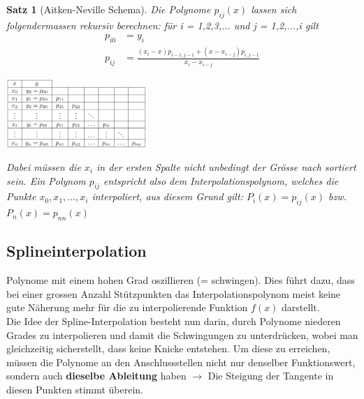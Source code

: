 \documentclass{article}
\newenvironment{Figure}
	{\par\medskip\noindent\minipage{\linewidth}}
	{\endminipage\par\medskip}
\theoremstyle{satz}
\newtheorem*{satz}{Satz}
\theoremstyle{definition}
\begin{document}
\theoremstyle{satz}
\begin{tcolorbox}
\begin{satz}[Aitken-Neville Schema]
Die Polynome $p_{ij}(x)$ lassen sich folgendermassen rekursiv berechnen: für i = 1,2,3,... und j = 1,2,...,i gilt
\begin{equation}
\begin{split}
p_{i0} &= y_i\\
p_{ij} &= \frac{(x_i-x)p_{i-1,j-1}+(x-x_{i-j}) p_{i,j-1}}{x_i-x_{i-j}}
\end{split}
\end{equation}
\begin{Figure}
\centering
\includegraphics[width=200px]{img/AitkenNevilleSchema.png}
	\label{fig:Schematische Darstellung für das Aitken-Neville-Schema}
\end{Figure}
Dabei müssen die $x_i$ in der ersten Spalte nicht unbedingt der Grösse nach sortiert sein. Ein Polynom $p_{ij}$ entspricht also dem Interpolationspolynom, welches die Punkte $x_0, x_1, ..., x_i$ interpoliert, aus diesem Grund gilt: $P_i(x) = p_{ij}(x)$ bzw. $P_n(x) = p_{nn}(x)$
\end{satz}
\end{tcolorbox}

\subsection{Splineinterpolation}
Polynome mit einem hohen Grad oszillieren (= schwingen). Dies führt dazu, dass bei einer grossen Anzahl Stützpunkten das Interpolationspolynom meist keine gute Näherung mehr für die zu interpolierende Funktion $f(x)$ darstellt.\\
Die Idee der Spline-Interpolation besteht nun darin, durch Polynome niederen Grades zu interpolieren und damit die Schwingungen zu unterdrücken, wobei man gleichzeitig sicherstellt, dass keine Knicke entstehen. Um diese zu erreichen, müssen die Polynome an den Anschlussstellen nicht nur denselber Funktionswert, sondern auch \textbf{dieselbe Ableitung} haben $\rightarrow$ Die Steigung der Tangente in diesen Punkten stimmt überein.
\end{document}
